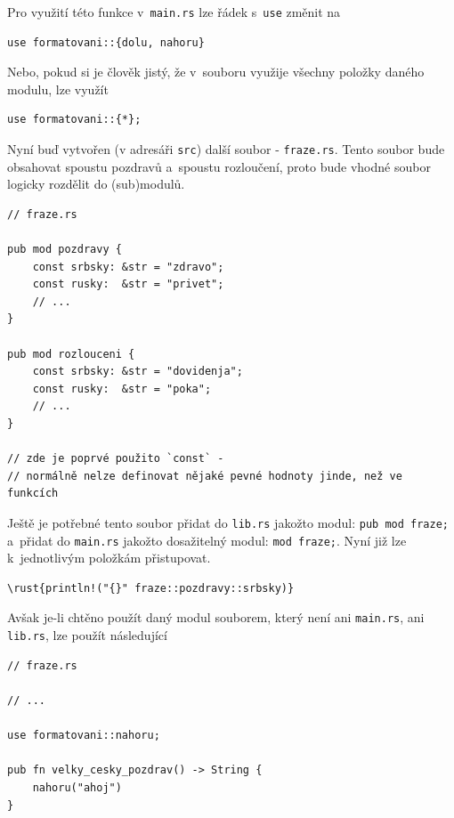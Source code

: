 \documentclass[a4paper, 12pt]{article} %
\newcommand{\rust}[1]{\texttt{#1}}
\begin{document}
        Pro využití této funkce v~\texttt{main.rs} lze řádek s~\rust{use} změnit na
        \begin{verbatim}
use formatovani::{dolu, nahoru}
        \end{verbatim}
        
        Nebo, pokud si je člověk jistý, že v~souboru využije všechny položky daného modulu, lze využít
        \begin{verbatim}
use formatovani::{*};
        \end{verbatim}
        
        Nyní buď vytvořen (v adresáři \texttt{src}) další soubor - \texttt{fraze.rs}. Tento soubor bude obsahovat spoustu pozdravů a~spoustu rozloučení, proto bude vhodné soubor logicky rozdělit do (sub)modulů.
        \begin{verbatim}
// fraze.rs

pub mod pozdravy {
    const srbsky: &str = "zdravo";
    const rusky:  &str = "privet";
    // ...
}

pub mod rozlouceni {
    const srbsky: &str = "dovidenja";
    const rusky:  &str = "poka";
    // ...
}

// zde je poprvé použito `const` - 
// normálně nelze definovat nějaké pevné hodnoty jinde, než ve funkcích
        \end{verbatim}
        
        Ještě je potřebné tento soubor přidat do \texttt{lib.rs} jakožto modul: \rust{pub mod fraze;} a~přidat do \texttt{main.rs} jakožto dosažitelný modul: \rust{mod fraze;}. Nyní již lze k~jednotlivým položkám přistupovat.
        \begin{verbatim}
\rust{println!("{}" fraze::pozdravy::srbsky)}
        \end{verbatim}
        
        Avšak je-li chtěno použít daný modul souborem, který není ani \texttt{main.rs}, ani \texttt{lib.rs}, lze použít následující
        \begin{verbatim}
// fraze.rs

// ...

use formatovani::nahoru;

pub fn velky_cesky_pozdrav() -> String {
    nahoru("ahoj")
}
        \end{verbatim}
        
        
\end{document}
